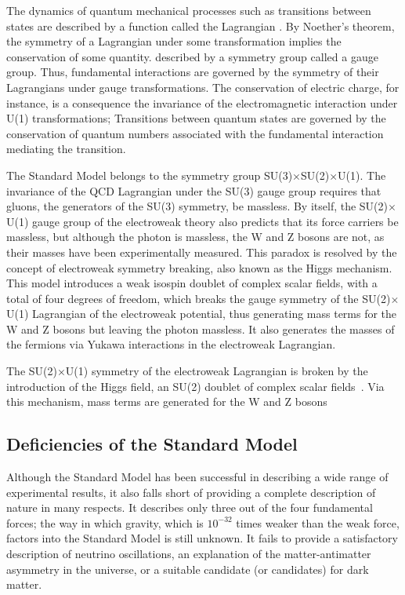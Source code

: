 The dynamics of quantum mechanical processes such as transitions between states are described by a function called the Lagrangian . By Noether's theorem, the symmetry of a Lagrangian under some transformation implies the conservation of some quantity. described by a symmetry group called a gauge group. Thus, fundamental interactions are governed by the symmetry of their Lagrangians under gauge transformations. The conservation of electric charge, for instance, is a consequence the invariance of the electromagnetic interaction under U(1) transformations; 
Transitions between quantum states are governed by the conservation of quantum numbers associated with the fundamental interaction mediating the transition.

The Standard Model belongs to the symmetry group SU(3)$\times$SU(2)$\times$U(1). The invariance of the QCD Lagrangian under the SU(3) gauge group requires that gluons, the generators of the SU(3) symmetry, be massless. By itself, the SU(2)$\times$U(1) gauge group of the electroweak theory also predicts that its force carriers be massless, but although the photon is massless, the W and Z bosons are not, as their masses have been experimentally measured. This paradox is resolved by the concept of electroweak symmetry breaking, also known as the Higgs mechanism. This model introduces a weak isospin doublet of complex scalar fields, with a total of four degrees of freedom, which breaks the gauge symmetry of the SU(2)$\times$U(1) Lagrangian of the electroweak potential, thus generating mass terms for the W and Z bosons but leaving the photon massless. It also generates the masses of the fermions via Yukawa interactions in the electroweak Lagrangian.

The SU(2)$\times$U(1) symmetry of the electroweak Lagrangian is broken by the introduction of the Higgs field, an SU(2) doublet of complex scalar fields~\cite{ThomsonPhysics}. Via this mechanism, mass terms are generated for the W and Z bosons 

\subsection{Deficiencies of the Standard Model\label{sec:SMdeficiencies}}

Although the Standard Model has been successful in describing a wide range of experimental results, it also falls short of providing a complete description of nature in many respects. It describes only three out of the four fundamental forces; the way in which gravity, which is $10^{-32}$ times weaker than the weak force, factors into the Standard Model is still unknown. It fails to provide a satisfactory description of neutrino oscillations, an explanation of the matter-antimatter asymmetry in the universe, or a suitable candidate (or candidates) for dark matter.

